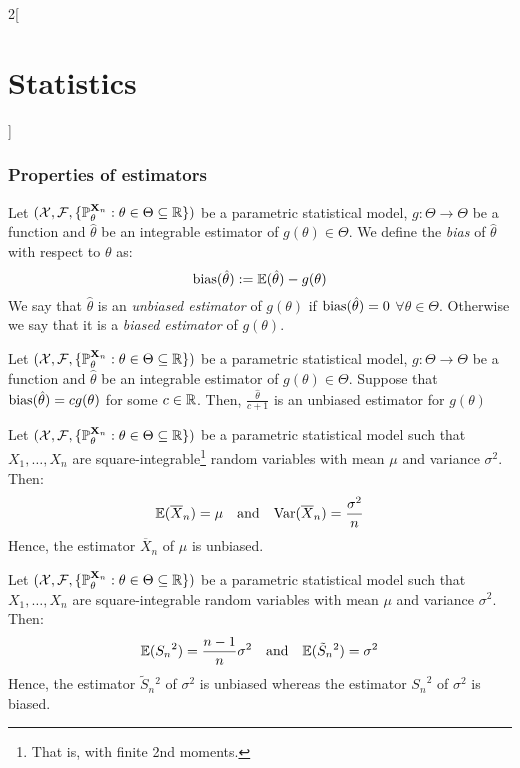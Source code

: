 \documentclass[../../../main_math.tex]{subfiles}
\begin{document}
\begin{multicols}{2}[\section{Statistics}]
  \subsubsection{Properties of estimators}
  \begin{definition}[Bias]
    Let $(\mathcal{X},\mathcal{F},\{\mathbb{P}_{\theta}^{\boldsymbol{\mathrm{X}}_n}:{\theta}\in\Theta\subseteq \mathbb{R}\})$ be a parametric statistical model, $g:\Theta\rightarrow\Theta$ be a function and ${\hat\theta}$ be an integrable estimator of $g({\theta})\in\Theta$. We define the \emph{bias} of ${\hat\theta}$ with respect to ${\theta}$ as: $$\operatorname{bias}({\hat\theta}):=\mathbb{E}({\hat\theta})-g({\theta})$$ We say that ${\hat\theta}$ is an \emph{unbiased estimator} of $g({\theta})$ if $\operatorname{bias}({\hat\theta})=0$ $\forall\theta\in\Theta$. Otherwise we say that it is a \emph{biased estimator} of $g({\theta})$.
  \end{definition}
  \begin{proposition}
    Let $(\mathcal{X},\mathcal{F},\{\mathbb{P}_{\theta}^{\boldsymbol{\mathrm{X}}_n}:{\theta}\in\Theta\subseteq \mathbb{R}\})$ be a parametric statistical model, $g:\Theta\rightarrow\Theta$ be a function and ${\hat\theta}$ be an integrable estimator of $g({\theta})\in\Theta$. Suppose that $\operatorname{bias}(\hat\theta)=cg(\theta)$ for some $c\in\mathbb{R}$. Then, $\frac{\hat\theta}{c+1}$ is an unbiased estimator for $g(\theta)$
  \end{proposition}
  \begin{proposition}
    Let $(\mathcal{X},\mathcal{F},\{\mathbb{P}_{\theta}^{\boldsymbol{\mathrm{X}}_n}:{\theta}\in\Theta\subseteq \mathbb{R}\})$ be a parametric statistical model such that $X_1,\ldots,X_n$ are square-integrable\footnote{That is, with finite 2nd moments.} \iid random variables with mean $\mu$ and variance $\sigma^2$. Then: $$\mathbb{E}(\overline{X}_n)=\mu\quad\text{and}\quad\mathrm{Var}{(\overline{X}_n)}=\frac{\sigma^2}{n}$$
    Hence, the estimator $\overline{X}_n$ of $\mu$ is unbiased.
  \end{proposition}
  \begin{proposition}
    Let $(\mathcal{X},\mathcal{F},\{\mathbb{P}_{\theta}^{\boldsymbol{\mathrm{X}}_n}:{\theta}\in\Theta\subseteq \mathbb{R}\})$ be a parametric statistical model such that $X_1,\ldots,X_n$ are square-integrable \iid random variables with mean $\mu$ and variance $\sigma^2$. Then: $$\mathbb{E}({S_n}^2)=\frac{n-1}{n}\sigma^2\quad\text{and}\quad\mathbb{E}(\tilde{S}_n{}^2)=\sigma^2$$
    Hence, the estimator $\tilde{S}_n{}^2$ of $\sigma^2$ is unbiased whereas the estimator ${S_n}^2$ of $\sigma^2$ is biased.
  \end{proposition}
  \begin{definition}

\end{definition}
\end{multicols}
\end{document}
